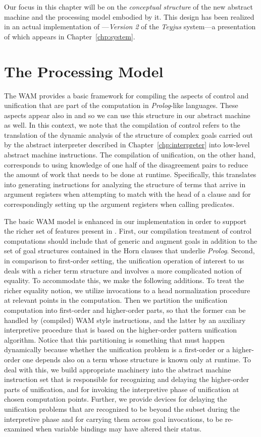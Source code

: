 Our focus in this chapter will be on
the {\em conceptual structure} of the new abstract machine and the
processing model embodied by it.
This design has been realized in an actual implementation of
---{\em Version 2} of the {\it Teyjus} system---a presentation
  of which appears in Chapter~\ref{chp:system}.

\section{The Processing Model}\label{sec:basic_model}
The WAM provides a basic framework for compiling the aspects of
control and unification that are part of the computation in {\em
  Prolog}-like languages. These aspects appear also in  and so we
can use this structure in our abstract machine as well.
In this context, we note that the compilation of control refers to the
translation of the dynamic analysis of the structure of complex goals
carried out by the abstract interpreter described in
Chapter~\ref{chp:interpreter} into low-level abstract machine
instructions. The compilation of unification, on the other hand,
corresponds to using knowledge of one half of the disagreement
pairs to reduce the amount of work that needs to be done at
runtime. Specifically, this translates into generating instructions for
analyzing the structure of terms that arrive in argument registers
when attempting to match with the head of a clause and for
correspondingly setting up the argument registers when calling
predicates.


The basic WAM model is enhanced in our implementation in order to
support the richer set of features present in .
First, our compilation treatment of control computations should include that
of generic and augment goals in addition to the set of goal structures
contained in the Horn clauses that underlie {\em Prolog}.
Second, in comparison to first-order setting, the unification
operation of interest to us deals with a richer term structure and involves a
more complicated notion of equality. To accommodate this, we make the
following additions. To treat the richer equality notion, we utilize
invocations to a head normalization procedure at relevant points in
the computation. Then we partition the unification computation into
first-order and higher-order parts, so that the former can be handled by
(compiled) WAM style instructions, and the latter by an auxiliary
interpretive procedure that is based on the higher-order pattern
unification algorithm. Notice that this partitioning is something that
must happen dynamically because whether the unification problem is a
first-order or a higher-order one depends also on a term whose
structure is known only at runtime. To deal with this, we build
appropriate machinery into the abstract machine instruction
set that is responsible for recognizing and delaying the higher-order
parts of unification, and for invoking the interpretive phase of
unification at chosen computation points. Further, we provide
devices for delaying the unification problems that are recognized to
be beyond the  subset during the interpretive phase and for
carrying them across goal invocations, to be re-examined when variable
bindings may have altered their status.

